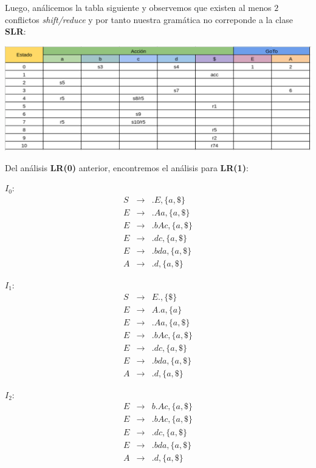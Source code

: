 Luego, análicemos la tabla siguiente y observemos que existen al menos $2$ conflictos \textit{shift/reduce}
y por tanto nuestra gramática no correponde a la clase \textbf{SLR}:

\begin{center}
        \includegraphics[width=.95\textwidth]{./T.png}
\end{center}

Del análisis \textbf{LR(0)} anterior, encontremos el análisis para \textbf{LR(1)}:\newline

$I_0$:
\begin{eqnarray*}
        S &\rightarrow& .E,   \{a, \$\}\\
        E &\rightarrow& .Aa,  \{a, \$\}\\
        E &\rightarrow& .bAc, \{a, \$\}\\
        E &\rightarrow& .dc,  \{a, \$\}\\
        E &\rightarrow& .bda, \{a, \$\}\\
        A &\rightarrow& .d,   \{a, \$\}
\end{eqnarray*}

$I_1$:
\begin{eqnarray*}
        S &\rightarrow& E., \{\$\}\\
        E &\rightarrow& A.a, \{a\}\\
        E &\rightarrow& .Aa, \{a, \$\}\\
        E &\rightarrow& .bAc, \{a, \$\}\\
        E &\rightarrow& .dc, \{a, \$\}\\
        E &\rightarrow& .bda, \{a, \$\}\\
        A &\rightarrow& .d, \{a, \$\}
\end{eqnarray*}

$I_2$:
\begin{eqnarray*}
    E &\rightarrow&  b.Ac, \{a, \$\}\\
    E &\rightarrow& .bAc, \{a, \$\}\\
    E &\rightarrow& .dc, \{a, \$\}\\
    E &\rightarrow& .bda, \{a, \$\}\\
    A &\rightarrow& .d, \{a, \$\}
\end{eqnarray*}

